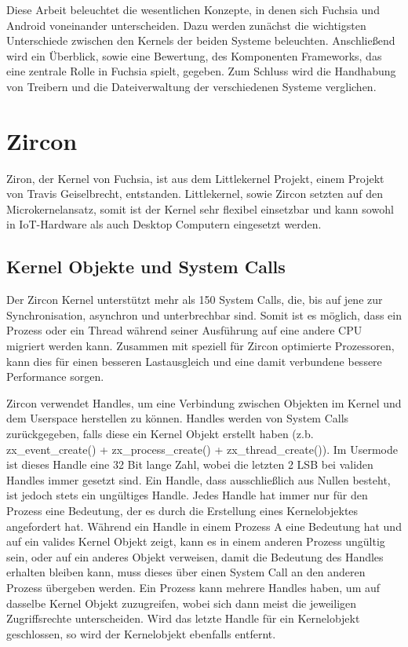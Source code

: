\documentclass[a4paper]{scrartcl}
\begin{document}
Diese Arbeit beleuchtet die wesentlichen Konzepte, in denen sich Fuchsia und Android voneinander unterscheiden. Dazu werden zunächst die wichtigsten Unterschiede zwischen den Kernels der beiden Systeme beleuchten. Anschließend wird ein Überblick, sowie eine Bewertung, des Komponenten Frameworks, das eine zentrale Rolle in Fuchsia spielt, gegeben. Zum Schluss wird die Handhabung von Treibern und die Dateiverwaltung der verschiedenen Systeme verglichen.

\section{Zircon}
Ziron, der Kernel von Fuchsia, ist aus dem Littlekernel Projekt, einem Projekt von Travis Geiselbrecht, entstanden. Littlekernel, sowie Zircon setzten auf den Microkernelansatz, somit ist der Kernel sehr flexibel einsetzbar und kann sowohl in IoT-Hardware als auch Desktop Computern eingesetzt werden.

\subsection{Kernel Objekte und System Calls}
Der Zircon Kernel unterstützt mehr als 150 System Calls, die, bis auf jene zur Synchronisation, asynchron und unterbrechbar sind.  \cite{Fuchsia.Zircon.Systemcalls} Somit ist es möglich, dass ein Prozess oder ein Thread während seiner Ausführung auf eine andere CPU migriert werden kann. Zusammen mit speziell für Zircon optimierte Prozessoren, kann dies für einen besseren Lastausgleich und eine damit verbundene bessere Performance sorgen.

Zircon verwendet Handles, um eine Verbindung zwischen Objekten im Kernel und dem Userspace herstellen zu können. Handles werden von System Calls zurückgegeben, falls diese ein Kernel Objekt erstellt haben (z.b. zx\_event\_create() + zx\_process\_create() + zx\_thread\_create()). Im Usermode ist dieses Handle eine 32 Bit lange Zahl, wobei die letzten 2 LSB bei validen Handles immer gesetzt sind. Ein Handle, dass ausschließlich aus Nullen besteht, ist jedoch stets ein ungültiges Handle. Jedes Handle hat immer nur für den Prozess eine Bedeutung, der es durch die Erstellung eines Kernelobjektes angefordert hat. Während ein Handle in einem Prozess A eine Bedeutung hat und auf ein valides Kernel Objekt zeigt, kann es in einem anderen Prozess ungültig sein, oder auf ein anderes Objekt verweisen, damit die Bedeutung des Handles erhalten bleiben kann, muss dieses über einen System Call an den anderen Prozess übergeben werden. Ein Prozess kann mehrere Handles haben, um auf dasselbe Kernel Objekt zuzugreifen, wobei sich dann meist die jeweiligen Zugriffsrechte unterscheiden. Wird das letzte Handle für ein Kernelobjekt geschlossen, so wird der Kernelobjekt ebenfalls entfernt. \cite{Fuchsia.Zircon.Handles}
\end{document}
